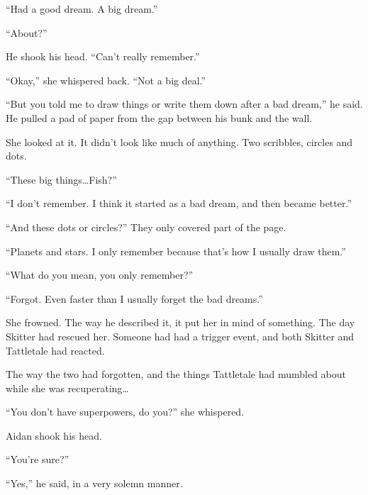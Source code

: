 ``Had a good dream.  A big dream.''



``About?''



He shook his head.  ``Can't really remember.''



``Okay,'' she whispered back.  ``Not a big deal.''



``But you told me to draw things or write them down after a bad dream,'' he said.  He pulled a pad of paper from the gap between his bunk and the wall.



She looked at it.  It didn't look like much of anything.  Two scribbles, circles and dots.



``These big things\ldots Fish?''



``I don't remember.  I think it started as a bad dream, and then became better.''



``And these dots or circles?''  They only covered part of the page.



``Planets and stars.  I only remember because that's how I usually draw them.''



``What do you mean, you only remember?''



``Forgot.  Even faster than I usually forget the bad dreams.''



She frowned.  The way he described it, it put her in mind of something.  The day Skitter had rescued her.  Someone had had a trigger event, and both Skitter and Tattletale had reacted.



The way the two had forgotten, and the things Tattletale had mumbled about while she was recuperating\ldots



``You don't have superpowers, do you?'' she whispered.



Aidan shook his head.



``You're sure?''



``Yes,'' he said, in a very solemn manner.



